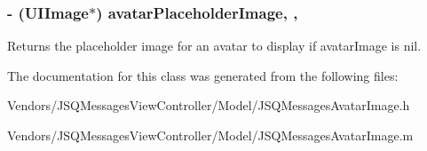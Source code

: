 \subsubsection[{avatar\+Placeholder\+Image}]{\setlength{\rightskip}{0pt plus 5cm}-\/ (U\+I\+Image$\ast$) avatar\+Placeholder\+Image\hspace{0.3cm}{\ttfamily [read]}, {\ttfamily [nonatomic]}, {\ttfamily [strong]}}\label{interface_j_s_q_messages_avatar_image_aede18829f8117a9d0116215e91163577}
Returns the placeholder image for an avatar to display if avatar\+Image is {\ttfamily nil}. 

The documentation for this class was generated from the following files\+:\begin{DoxyCompactItemize}
\item 
Vendors/\+J\+S\+Q\+Messages\+View\+Controller/\+Model/J\+S\+Q\+Messages\+Avatar\+Image.\+h\item 
Vendors/\+J\+S\+Q\+Messages\+View\+Controller/\+Model/J\+S\+Q\+Messages\+Avatar\+Image.\+m\end{DoxyCompactItemize}
